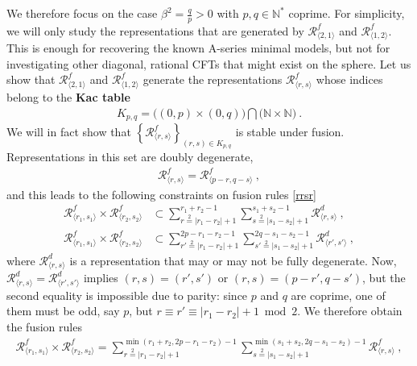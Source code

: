 \documentclass[12pt, a4paper]{article}
\newcommand{\myindex}[1]{\textbf{\boldmath #1}}
\theoremstyle{break}
\begin{document}
We therefore focus on the case $\beta^2 = \frac{q}{p}>0$ with $p,q\in\mathbb{N}^*$ coprime. For simplicity, we will only study the representations that are generated by $\mathcal{R}^f_{\langle 2,1\rangle}$ and $\mathcal{R}^f_{\langle 1,2\rangle}$. This is enough for recovering the known A-series minimal models, but not for investigating other diagonal, rational CFTs that might exist on the sphere. 
Let us show that $\mathcal{R}^f_{\langle 2,1\rangle}$ and $\mathcal{R}^f_{\langle 1,2\rangle}$ generate the representations $\mathcal{R}^f_{\langle r,s\rangle}$  whose indices belong to the \myindex{Kac table}
\begin{align}
 \boxed{ K_{p, q}=  \big((0,p)\times (0,q)\big)\bigcap \big(\mathbb{N}\times \mathbb{N}\big) }\ .
 \label{kac}
\end{align}
We will in fact show that $\left\{\mathcal{R}^f_{\langle r,s\rangle}\right\}_{(r,s)\in K_{p, q}}$ is stable under fusion. Representations in this set are doubly degenerate, 
\begin{align}
 \mathcal{R}^f_{\langle r,s\rangle} = \mathcal{R}^f_{\langle p-r,q-s\rangle}\ , 
 \label{prqs}
\end{align}
and this leads to the following constraints on fusion rules \eqref{rrsr}
\begin{subequations}
\begin{align}
 \mathcal{R}^f_{\langle r_1,s_1\rangle} \times \mathcal{R}^f_{\langle r_2,s_2\rangle} &\subset \sum_{r\overset{2}{=} |r_1-r_2|+1}^{r_1+r_2-1}\sum_{s\overset{2}{=} |s_1-s_2|+1}^{s_1+s_2-1} \mathcal{R}^d_{\langle r,s\rangle} \ , 
 \\
 \mathcal{R}^f_{\langle r_1,s_1\rangle} \times \mathcal{R}^f_{\langle r_2,s_2\rangle} &\subset \sum_{r'\overset{2}{=} |r_1-r_2|+1}^{2p-r_1-r_2-1} \sum_{s'\overset{2}{=} |s_1-s_2|+1}^{2q-s_1-s_2-1}\mathcal{R}^d_{\langle r',s'\rangle} \ , 
\end{align}
\end{subequations}
where $\mathcal{R}^d_{\langle r,s\rangle}$ is a representation that may or may not be fully degenerate. Now, $\mathcal{R}^d_{\langle r,s\rangle} = \mathcal{R}^d_{\langle r',s'\rangle}$ implies $(r,s)=(r',s')$ or $(r,s)=(p-r',q-s')$, but the second equality is impossible due to parity: since $p$ and $q$ are coprime, one of them must be odd, say $p$, but $r\equiv r'\equiv |r_1-r_2|+1\bmod 2$. We therefore obtain the fusion rules 
\begin{align}
 \boxed{\mathcal{R}^f_{\langle r_1,s_1\rangle} \times \mathcal{R}^f_{\langle r_2,s_2\rangle} = \sum_{r\overset{2}{=} |r_1-r_2|+1}^{\min(r_1+r_2,2p-r_1-r_2)-1}\sum_{s\overset{2}{=} |s_1-s_2|+1}^{\min(s_1+s_2,2q-s_1-s_2)-1} \mathcal{R}^f_{\langle r,s\rangle}} \ , 
 \label{rfrf}
\end{align}
\end{document}
